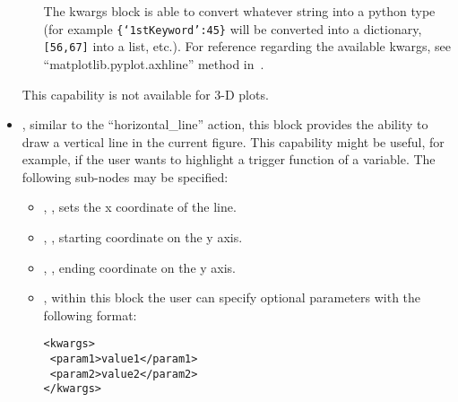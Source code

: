 \begin{itemize}
\begin{itemize}
    The kwargs block is able to convert whatever string into a python type (for
    example \texttt{\{`1stKeyword':45\}} will
    be converted into a dictionary, 
    \texttt{[56,67]} into a list, etc.).
    For reference regarding the available kwargs, see
    ``matplotlib.pyplot.axhline'' method in~\cite{MatPlotLib}.
  \end{itemize}
  \nb This capability is not available for 3-D plots.
  \item {}, similar to the ``horizontal\_line'' action,
  this block provides the ability to draw a vertical line in the current figure.
  This capability might be useful, for example, if the user wants to highlight a
  trigger function of a variable.
  The following sub-nodes may be specified:
  \begin{itemize}
    \item {}, , sets the x coordinate of the
    line.
    \item {}, , starting coordinate on
    the y axis.
    \item {}, , ending coordinate on the
    y axis.
    \item {}, within this block the user can specify optional
    parameters with the following format:

\begin{lstlisting}[style=XML]
<kwargs>
 <param1>value1</param1>
 <param2>value2</param2>
</kwargs>
\end{lstlisting}


\end{itemize}
\end{itemize}
